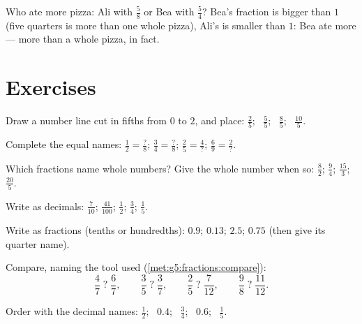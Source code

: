 \begin{example}\label{ex:g5:fractions:compare}
Who ate more pizza: Ali with $\frac58$ or Bea with $\frac54$? Bea's
fraction is bigger than $1$ (five quarters is more than one whole
pizza), Ali's is smaller than $1$: Bea ate more --- more than a
whole pizza, in fact.
\end{example}

\section{Exercises}

\begin{exercise}[$\star$]\label{exo:g5:fractions:1}
Draw a number line cut in fifths from $0$ to $2$, and place:
$\frac25$; \ $\frac55$; \ $\frac85$; \ $\frac{10}{5}$.
\end{exercise}

\begin{exercise}[$\star$]\label{exo:g5:fractions:2}
Complete the equal names:
$\frac12 = \frac{?}{8}$; \quad
$\frac34 = \frac{?}{8}$; \quad
$\frac{2}{5} = \frac{4}{?}$; \quad
$\frac{6}{9} = \frac{2}{?}$.
\end{exercise}

\begin{exercise}[$\star$]\label{exo:g5:fractions:3}
Which fractions name whole numbers? Give the whole number when so:
$\frac82$; \quad $\frac{9}{4}$; \quad $\frac{15}{3}$; \quad
$\frac{20}{5}$.
\end{exercise}

\begin{exercise}[$\star$]\label{exo:g5:fractions:4}
Write as decimals: $\frac{7}{10}$; \quad $\frac{41}{100}$; \quad
$\frac12$; \quad $\frac34$; \quad $\frac15$.
\end{exercise}

\begin{exercise}[$\star$]\label{exo:g5:fractions:5}
Write as fractions (tenths or hundredths): $0.9$; \quad $0.13$;
\quad $2.5$; \quad $0.75$ (then give its quarter name).
\end{exercise}

\begin{exercise}[$\star$]\label{exo:g5:fractions:6}
Compare, naming the tool used
(\cref{met:g5:fractions:compare}):
\[
\frac47 \;?\; \frac67, \qquad
\frac35 \;?\; \frac37, \qquad
\frac25 \;?\; \frac{7}{12}, \qquad
\frac98 \;?\; \frac{11}{12} .
\]
\end{exercise}

\begin{exercise}[$\star$]\label{exo:g5:fractions:7}
Order with the decimal names: $\frac12$; \ $0.4$; \ $\frac34$; \
$0.6$; \ $\frac15$.
\end{exercise}


